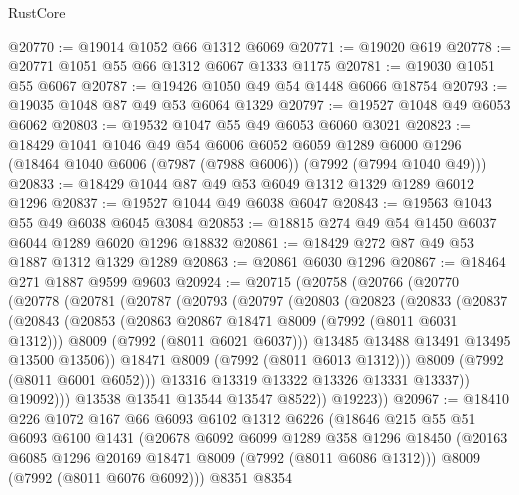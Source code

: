 \begin{lexlean}{RustCore}
\begin{coremodule}
@20770 := @19014 @1052 @66 @1312 @6069
@20771 := @19020 @619
@20778 := @20771 @1051 @55 @66 @1312 @6067 @1333 @1175
@20781 := @19030 @1051 @55 @6067
@20787 := @19426 @1050 @49 @54 @1448 @6066 @18754
@20793 := @19035 @1048 @87 @49 @53 @6064 @1329
@20797 := @19527 @1048 @49 @6053 @6062
@20803 := @19532 @1047 @55 @49 @6053 @6060 @3021
@20823 := @18429
    @1041
    @1046
    @49
    @54
    @6006
    @6052
    @6059
    @1289
    @6000
    @1296
    (@18464 @1040 @6006 (@7987 (@7988 @6006)) (@7992 (@7994 @1040 @49)))
@20833 := @18429 @1044 @87 @49 @53 @6049 @1312 @1329 @1289 @6012 @1296
@20837 := @19527 @1044 @49 @6038 @6047
@20843 := @19563 @1043 @55 @49 @6038 @6045 @3084
@20853 := @18815 @274 @49 @54 @1450 @6037 @6044 @1289 @6020 @1296 @18832
@20861 := @18429 @272 @87 @49 @53 @1887 @1312 @1329 @1289
@20863 := @20861 @6030 @1296
@20867 := @18464 @271 @1887 @9599 @9603
@20924 := @20715
    (@20758
      (@20766
        (@20770
          (@20778
            (@20781
              (@20787
                (@20793
                  (@20797
                    (@20803
                      (@20823
                        (@20833
                          (@20837
                            (@20843
                              (@20853
                                (@20863 @20867 @18471 @8009 (@7992 (@8011 @6031 @1312)))
                                @8009
                                (@7992 (@8011 @6021 @6037)))
                              @13485
                              @13488
                              @13491
                              @13495
                              @13500
                              @13506))
                          @18471
                          @8009
                          (@7992 (@8011 @6013 @1312)))
                        @8009
                        (@7992 (@8011 @6001 @6052)))
                      @13316
                      @13319
                      @13322
                      @13326
                      @13331
                      @13337))
                  @19092)))
            @13538
            @13541
            @13544
            @13547
            @8522))
        @19223))
@20967 := @18410
    @226
    @1072
    @167
    @66
    @6093
    @6102
    @1312
    @6226
    (@18646
      @215
      @55
      @51
      @6093
      @6100
      @1431
      (@20678
        @6092
        @6099
        @1289
        @358
        @1296
        @18450
        (@20163 @6085 @1296 @20169 @18471 @8009 (@7992 (@8011 @6086 @1312)))
        @8009
        (@7992 (@8011 @6076 @6092)))
      @8351
      @8354

\end{coremodule}
\end{lexlean}
